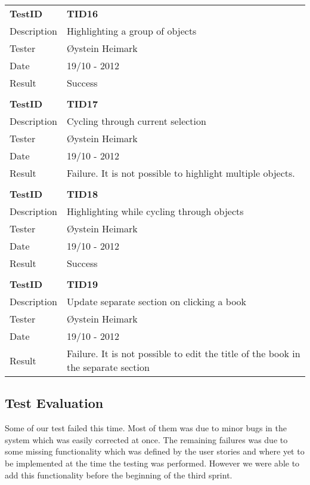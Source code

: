 \begin{table}
\begin{tabular}{ l p{13cm} }
\bf{TestID}		&\bf{TID16}			\\
Description	&Highlighting a group of objects\\
Tester		&Øystein Heimark	\\
Date			&19/10 - 2012	\\
Result		&Success			\\
\hline \\ [-2.0ex]

\bf{TestID}		&\bf{TID17}			\\
Description	&Cycling through current selection	\\
Tester		&Øystein Heimark	\\
Date			&19/10 - 2012	\\
Result		&Failure. It is not possible to highlight multiple objects.		\\
\hline \\ [-2.0ex]

\bf{TestID}		&\bf{TID18}			\\
Description	&Highlighting while cycling through objects	\\
Tester		&Øystein Heimark	\\
Date			&19/10 - 2012	\\
Result		&Success	\\
\hline \\ [-2.0ex]

\bf{TestID}		&\bf{TID19}			\\
Description	&Update separate section on clicking a book	\\
Tester		&Øystein Heimark	\\
Date			&19/10 - 2012	\\
Result		&Failure. It is not possible to edit the title of the book in the separate section		\\
\hline

\end{tabular}
\label{table:sp2testresults}
\end{table}

\subsection{Test Evaluation}
Some of our test failed this time. Most of them was due to minor bugs in the system which was easily corrected at once. The remaining failures was due to some missing functionality which was defined by the user stories and where yet to be implemented at the time the testing was performed. However we were able to add this functionality before the beginning of the third sprint.
